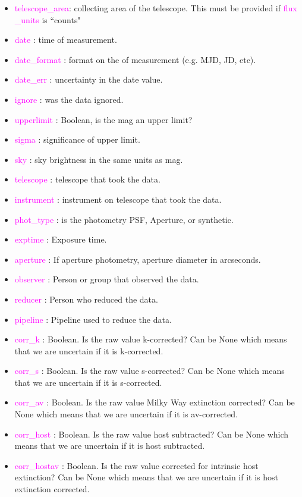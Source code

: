 \documentclass[tighten]{aastex631}
\newcommand{\keyword}[1]{\textcolor{magenta}{#1}}
\begin{document}
\begin{itemize}
    \item \keyword{telescope\_area}: collecting area of the telescope. This must be provided if \keyword{flux
    \_units} is ``counts"
    \item \keyword{date} : time of measurement.
    \item \keyword{date\_format} : format on the of measurement (e.g. MJD, JD, etc).
    \item \keyword{date\_err} : uncertainty in the date value.
    \item \keyword{ignore} : was the data ignored.
    \item \keyword{upperlimit} : Boolean, is the mag an upper limit?
    \item \keyword{sigma} : significance of upper limit.
    \item \keyword{sky} : sky brightness in the same units as mag.
    \item \keyword{telescope} : telescope that took the data.
    \item \keyword{instrument} : instrument on telescope that took the data.
    \item \keyword{phot\_type} : is the photometry PSF, Aperture, or synthetic.
    \item \keyword{exptime} : Exposure time.
    \item \keyword{aperture} : If aperture photometry, aperture diameter in arcseconds.
    \item \keyword{observer} : Person or group that observed the data.
    \item \keyword{reducer} : Person who reduced the data.
    \item \keyword{pipeline} : Pipeline used to reduce the data.
    \item \keyword{corr\_k} : Boolean. Is the raw value k-corrected? Can be None which means that we are uncertain if it is k-corrected.
    \item \keyword{corr\_s} : Boolean. Is the raw value s-corrected? Can be None which means that we are uncertain if it is s-corrected.
    \item \keyword{corr\_av} : Boolean. Is the raw value Milky Way extinction corrected? Can be None which means that we are uncertain if it is av-corrected.
    \item \keyword{corr\_host} : Boolean. Is the raw value host subtracted? Can be None which means that we are uncertain if it is host subtracted.
    \item \keyword{corr\_hostav} : Boolean. Is the raw value corrected for intrinsic host extinction?  Can be None which means that we are uncertain if it is host extinction corrected.

\end{itemize}
\end{document}
